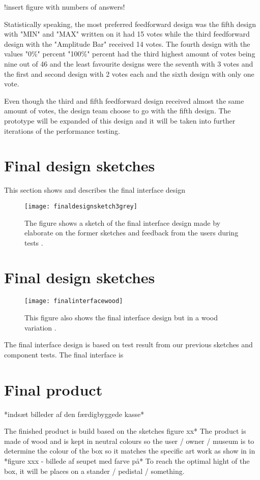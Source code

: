 !insert figure with numbers of answers!

Statistically speaking, the most preferred feedforward design was the fifth design with "MIN" and "MAX" written on it had 15 votes while the third feedforward design with the "Amplitude Bar"  received 14 votes. The fourth design with the values "0\%" percent "100\%" percent had the third highest amount of votes being nine out of 46 and the least favourite designs were the seventh with 3 votes and the first and second design with 2 votes each and the sixth design with only one vote. 

Even though the third and fifth feedforward design received almost the same amount of votes, the design team choose to go with the fifth design. The prototype will be expanded of this design and it will be taken into further iterations of the performance testing. 


\section{Final design sketches}
This section shows and describes the final interface design

\begin{figure}[!h] 
\centering
\texttt{[image: finaldesignsketch3grey]}
\caption{\label{fig:inaldesignsketch3grey} The figure shows a sketch of the final interface design made by elaborate on the former sketches and feedback from the users during tests .}
\end{figure}

\section{Final design sketches}
\begin{figure}[!h] 
\centering
\texttt{[image: finalinterfacewood]}
\caption{\label{fig:finalinterfacewood} This figure also shows the final interface design but in a wood variation .}
\end{figure}
 
 
 The final interface design is based on test result from our previous sketches and component tests. The final interface is 
 
 
 
 \section{Final product }
*indsæt billeder af den færdigbyggede kasse* 

The finished product is build based on the sketches figure xx* The product is made of wood and is kept in neutral colours so the user / owner / museum is to determine the colour of the box so it matches the specific art work as show in in *figure xxx - billede af seupet med farve på* To reach the optimal hight of the box, it will be places on a stander / pedistal / something. 








